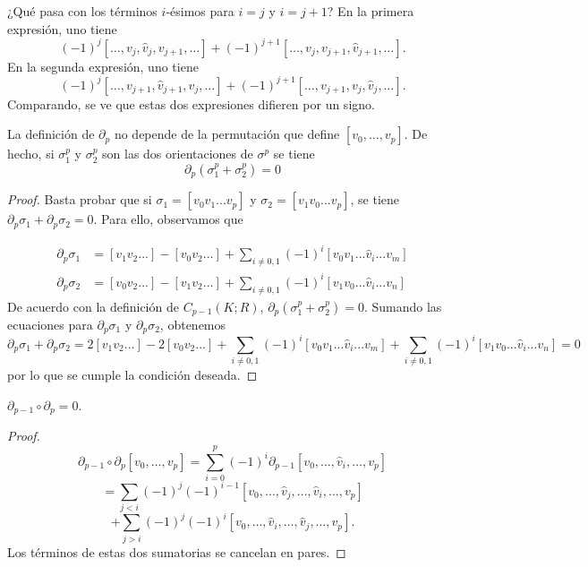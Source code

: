 ¿Qué pasa con los términos \(i\)-ésimos para \(i = j\) y \(i = j + 1\)? En la primera expresión, uno tiene
\[
(-1)^j[\ldots, v_j, \hat{v}_{j}, v_{j+1}, \ldots] + (-1)^{j+1}[\ldots, v_j, v_{j+1}, \hat{v}_{j+1}, \ldots].
\]
En la segunda expresión, uno tiene
\[
(-1)^j[\ldots, v_{j+1}, \hat{v}_{j+1}, v_j, \ldots] + (-1)^{j+1}[\ldots, v_{j+1}, v_j, \hat{v}_j, \ldots].
\]
Comparando, se ve que estas dos expresiones difieren por un signo.

\begin{lema}
	La definición de $\partial_p$ no depende de la permutación que define $[v_0, \dots, v_p]$. De hecho, si $\sigma^p_1$ y $\sigma^p_2$ son las dos orientaciones de $\sigma^p$ se tiene
	\[ \partial_p(\sigma^p_1+\sigma^p_2) = 0 \]
\end{lema}
\begin{proof}
	Basta probar que si $\sigma_{1} = [v_{0}v_{1}...v_{p}]$ y $\sigma_{2} = [v_{1}v_{0}...v_{p}]$, se tiene $\partial_{p}\sigma_{1} + \partial_{p}\sigma_{2} = 0$.
	Para ello, observamos que
	
	\begin{align*}
		\partial_{p}\sigma_{1} &= [v_{1}v_{2}...] - [v_{0}v_{2}...] + \sum_{i\ne0,1}(-1)^{i}[v_{0}v_{1}...\hat{v}_{i}...v_{m}]\\
		\partial_{p}\sigma_{2} &= [v_{0}v_{2}...] - [v_{1}v_{2}...] + \sum_{i\ne0,1}(-1)^{i}[v_{1}v_{0}...\hat{v}_{i}...v_{n}]
	\end{align*}
	De acuerdo con la definición de $C_{p-1}(K;R)$, $\partial_{p}(\sigma_{1}^{p}+\sigma_{2}^{p})=0$.
	Sumando las ecuaciones para $\partial_{p}\sigma_{1}$ y $\partial_{p}\sigma_{2}$, obtenemos
	\[
		\partial_{p}\sigma_{1} + \partial_{p}\sigma_{2} = 2[v_{1}v_{2}...] - 2[v_{0}v_{2}...]
		+ \sum_{i\ne0,1}(-1)^{i}[v_{0}v_{1}...\hat{v}_{i}...v_{m}] + \sum_{i\ne0,1}(-1)^{i}[v_{1}v_{0}...\hat{v}_{i}...v_{n}] = 0
	\]
	por lo que se cumple la condición deseada.
\end{proof}

\begin{lema}
	\(\partial_{p-1} \circ \partial_p = 0\).
\end{lema}
\begin{proof}
	\[
	\partial_{p-1} \circ \partial_p[v_0, \ldots, v_p] = \sum_{i=0}^{p} (-1)^i\partial_{p-1}[v_0, \ldots, \hat{v}_i, \ldots, v_p]
	\]
	\[
	= \sum_{j<i} (-1)^j(-1)^{i-1}[v_0, \ldots, \hat{v}_j, \ldots, \hat{v}_i, \ldots, v_p]
	\]
	\[
	+ \sum_{j>i} (-1)^j(-1)^i[v_0, \ldots, \hat{v}_i, \ldots, \hat{v}_j, \ldots, v_p].
	\]
	Los términos de estas dos sumatorias se cancelan en pares.
\end{proof}

